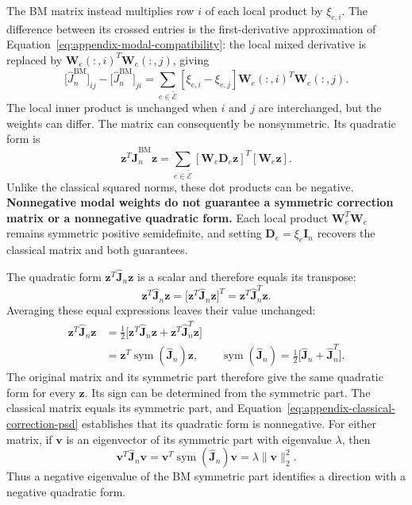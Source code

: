 \documentclass[a4paper,12pt]{article}
\newcommand{\vect}[1]{\boldsymbol{#1}}
\newcommand{\matr}[1]{\boldsymbol{#1}}
\begin{document}
The BM matrix instead multiplies row $i$ of each local product by $\xi_{e,i}$. The difference between its crossed entries is the first-derivative approximation of Equation~\eqref{eq:appendix-modal-compatibility}: the local mixed derivative is replaced by $\matr{W}_e(:,i)^T\matr{W}_e(:,j)$, giving
\begin{equation}
 \bigl[\widehat J_n^{\mathrm{BM}}\bigr]_{ij}
 -\bigl[\widehat J_n^{\mathrm{BM}}\bigr]_{ji}
 =\sum_{e\in\widetilde{\mathcal E}}[\xi_{e,i}-\xi_{e,j}]
       \matr{W}_e(:,i)^T\matr{W}_e(:,j).
 \label{eq:appendix-bm-correction-asymmetry}
\end{equation}
The local inner product is unchanged when $i$ and $j$ are interchanged, but the weights can differ. The matrix can consequently be nonsymmetric. Its quadratic form is
\begin{equation}
 \vect{z}^T\widehat{\matr{J}}_n^{\mathrm{BM}}\vect{z}
 =\sum_{e\in\widetilde{\mathcal E}}
       [\matr{W}_e\matr{D}_e\vect{z}]^T[\matr{W}_e\vect{z}].
 \label{eq:appendix-bm-correction-quadratic-form}
\end{equation}
Unlike the classical squared norms, these dot products can be negative. \textbf{Nonnegative modal weights do not guarantee a symmetric correction matrix or a nonnegative quadratic form.} Each local product $\matr{W}_e^T\matr{W}_e$ remains symmetric positive semidefinite, and setting $\matr{D}_e=\xi_e\matr{I}_n$ recovers the classical matrix and both guarantees.

The quadratic form $\vect{z}^T\widehat{\matr{J}}_n\vect{z}$ is a scalar and therefore equals its transpose:
\[
 \vect{z}^T\widehat{\matr{J}}_n\vect{z}
 =\bigl[\vect{z}^T\widehat{\matr{J}}_n\vect{z}\bigr]^T
 =\vect{z}^T\widehat{\matr{J}}_n^T\vect{z}.
\]
Averaging these equal expressions leaves their value unchanged:
\begin{equation}
 \begin{aligned}
 \vect{z}^T\widehat{\matr{J}}_n\vect{z}
 &=\frac12\bigl[\vect{z}^T\widehat{\matr{J}}_n\vect{z}
                 +\vect{z}^T\widehat{\matr{J}}_n^T\vect{z}\bigr]\\
 &=\vect{z}^T\operatorname{sym}(\widehat{\matr{J}}_n)\vect{z},
 \qquad
 \operatorname{sym}(\widehat{\matr{J}}_n)
 =\frac12\bigl[\widehat{\matr{J}}_n+\widehat{\matr{J}}_n^T\bigr].
 \end{aligned}
 \label{eq:appendix-symmetric-part}
\end{equation}
The original matrix and its symmetric part therefore give the same quadratic form for every $\vect{z}$. Its sign can be determined from the symmetric part. The classical matrix equals its symmetric part, and Equation~\eqref{eq:appendix-classical-correction-psd} establishes that its quadratic form is nonnegative. For either matrix, if $\vect{v}$ is an eigenvector of its symmetric part with eigenvalue $\lambda$, then
\[
 \vect{v}^T\widehat{\matr{J}}_n\vect{v}
 =\vect{v}^T\operatorname{sym}(\widehat{\matr{J}}_n)\vect{v}
 =\lambda\|\vect{v}\|_2^2.
\]
Thus a negative eigenvalue of the BM symmetric part identifies a direction with a negative quadratic form.
\end{document}
